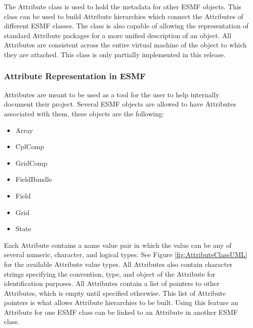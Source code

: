 %

The Attribute class is used to hold the metadata for other ESMF objects.  This class can be used to build Attribute hierarchies which connect the Attributes of different ESMF classes.  The class is also capable of allowing the representation of standard Attribute packages for a more unified description of an object.  All Attributes are consistent across the entire virtual machine of the object to which they are attached.  This class is only partially implemented in this release.

\subsubsection{Attribute Representation in ESMF}

Attributes are meant to be used as a tool for the user to help internally document their project.   Several ESMF objects are allowed to have Attributes associated with them, these objects are the following:

\begin{itemize}
\item Array
\item CplComp
\item GridComp
\item FieldBundle
\item Field
\item Grid
\item State
\end{itemize}

Each Attribute contains a name value pair in which the value can be any of several numeric, character, and logical types.  See Figure \ref{fig:AttributeClassUML} for the available Attribute value types.  All Attributes also contain character strings specifying the convention, type, and object of the Attribute for identification purposes.  All Attributes contain a list of pointers to other Attributes, which is empty until specified otherwise.  This list of Attribute pointers is what allows Attribute hierarchies to be built.  Using this feature an Attribute for one ESMF class can be linked to an Attribute in another ESMF class.

